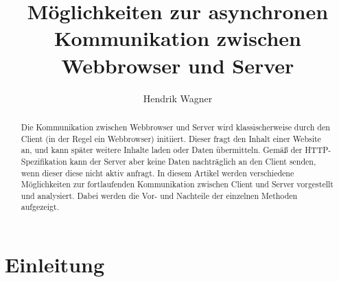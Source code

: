 \documentclass[sigplan, screen]{acmart}
\begin{document}
\title{Möglichkeiten zur asynchronen Kommunikation zwischen Webbrowser und Server}

\author{Hendrik Wagner}


\begin{abstract}
  Die Kommunikation zwischen Webbrowser und Server wird klassischerweise durch den Client (in der Regel ein Webbrowser) initiiert.
  Dieser fragt den Inhalt einer Website an, und kann später weitere Inhalte laden oder Daten übermitteln.
  Gemäß der HTTP-Spezifikation kann der Server aber keine Daten nachträglich an den Client senden, wenn dieser diese nicht aktiv anfragt.
  In diesem Artikel werden verschiedene Möglichkeiten zur fortlaufenden Kommunikation zwischen Client und Server vorgestellt und analysiert.
  Dabei werden die Vor- und Nachteile der einzelnen Methoden aufgezeigt.
\end{abstract}


\maketitle
{}

\tableofcontents
\newpage



\section{Einleitung}
\end{document}
